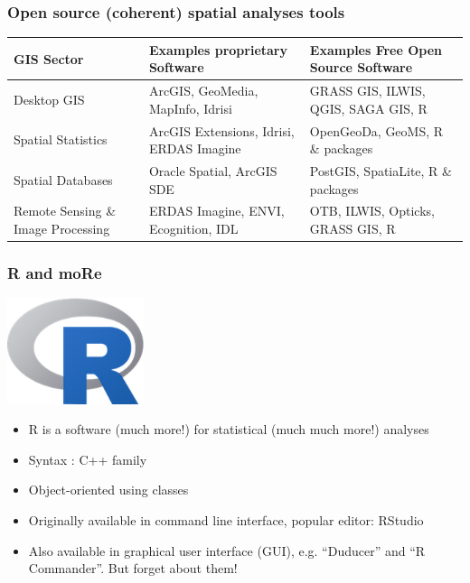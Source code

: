 \documentclass{beamer}
\begin{document}
\begin{frame}
\frametitle{Open source (coherent) spatial analyses tools}
\centering
\begin{table}[h]
\begin{tabular}{p{3.0cm} p{4.0cm} p{4.0cm}}

\toprule

GIS Sector & Examples proprietary Software & Examples Free Open Source Software\\

\midrule

Desktop GIS & ArcGIS, GeoMedia, MapInfo, Idrisi & GRASS GIS, ILWIS, QGIS, SAGA GIS, \alert{R}\\[0.2cm]
Spatial Statistics & ArcGIS Extensions, Idrisi, ERDAS Imagine & OpenGeoDa, GeoMS, \alert{R \& packages} \\[0.2cm]
Spatial Databases & Oracle Spatial, ArcGIS SDE & PostGIS, SpatiaLite, \alert{R \& packages}\\[0.2cm]
Remote Sensing \& Image Processing & ERDAS Imagine, ENVI, Ecognition, IDL & OTB, ILWIS, Opticks, GRASS GIS, \alert{R}\\

\bottomrule

\end{tabular}
\end{table}
\end{frame}


\begin{frame}
\frametitle{R and moRe}
\centering
\includegraphics[width=0.3\textwidth]{Figures/Rlogo.png}
\pause
\begin{itemize}
\item R is a software (\alert{much more!}) for statistical (\alert{much much more!}) analyses
\pause
\item Syntax : C++ family
\pause
\item Object-oriented using classes
\pause
\item Originally available in command line interface, popular editor: \alert{RStudio}
\pause
\item Also available in graphical user interface (GUI), e.g. ``Duducer'' and ``R Commander''. \alert{But forget about them!}
\end{itemize}
\end{frame}
\end{document}
